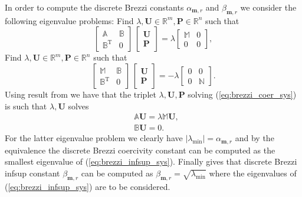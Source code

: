 \documentclass[a4paper,10pt]{article}
\newcommand{\R}{\ensuremath{\mathbb{R}}}
\newcommand{\mm}{\ensuremath{\mathbf{m}}}
\newcommand{\Amat}{\ensuremath{\mathbb{A}}}
\newcommand{\Bmat}{\ensuremath{\mathbb{B}}}
\newcommand{\Mmat}{\ensuremath{\mathbb{M}}}
\newcommand{\Nmat}{\ensuremath{\mathbb{N}}}
\newcommand{\Uvec}{\ensuremath{\mathbf{U}}}
\newcommand{\Pvec}{\ensuremath{\mathbf{P}}}
\begin{document}
  In order to compute the discrete Brezzi constants $\alpha_{\mm, r}$ and
  $\beta_{\mm, r}$ we consider the following eigenvalue problems: Find
  $\lambda, \Uvec\in\R^m, \Pvec\in\R^n$ such that
  \begin{equation}
    \label{eq:brezzi_coer_sys}
    \begin{bmatrix}
      \mathbb{A} & \mathbb{B} \\
      \mathbb{B}^{\text{T}} & 0
    \end{bmatrix}
    \,
    \begin{bmatrix}
      \mathbf{U} \\
      \mathbf{P}
    \end{bmatrix}
    =
    \lambda
    \begin{bmatrix}
      \Mmat & 0\\
      0 & 0
    \end{bmatrix},
  \end{equation}
  Find $\lambda, \Uvec\in\R^m, \Pvec\in\R^n$ such that
  \begin{equation}
    \label{eq:brezzi_infsup_sys}
    \begin{bmatrix}
      \Mmat & \mathbb{B} \\
      \mathbb{B}^{\text{T}} & 0
    \end{bmatrix}
    \,
    \begin{bmatrix}
      \mathbf{U} \\
      \mathbf{P}
    \end{bmatrix}
    =
    -\lambda
    \begin{bmatrix}
      0 & 0\\
      0 & \Nmat
    \end{bmatrix}.
  \end{equation}
  Using result from \cite{rognes} we have that the triplet $\lambda, \Uvec,
  \Pvec$ solving (\ref{eq:brezzi_coer_sys}) is such that $\lambda, \Uvec$ solves
  \[
    \begin{aligned}
      &\Amat\Uvec = \lambda\Mmat\Uvec,\\
      &\Bmat\Uvec = 0.
    \end{aligned}
  \]
  For the latter eigenvalue problem we clearly have 
  $\left|\lambda_{\text{min}}\right|=\alpha_{\mm, r}$ and by the equivalence
  the discrete Brezzi coercivity constant can be computed as the smallest
  eigenvalue of (\ref{eq:brezzi_infsup_sys}). Finally \cite{qin} gives that
  discrete Brezzi infsup constant $\beta_{\mm, r}$ can be computed as
  $\beta_{\mm, r}=\sqrt{\lambda_\text{min}}$ where the eigenvalues of
  (\ref{eq:brezzi_infsup_sys}) are to be considered.
\end{document}
